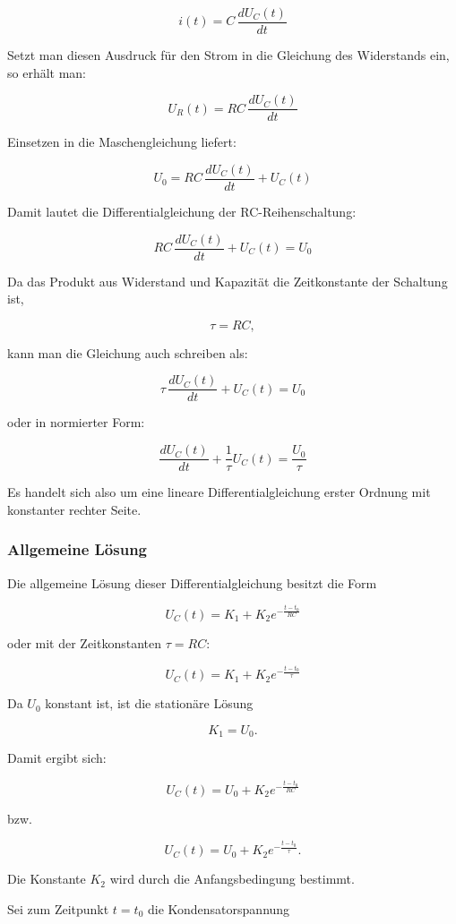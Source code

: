 \[
i(t) = C\,\frac{dU_C(t)}{dt}
\]

Setzt man diesen Ausdruck für den Strom in die Gleichung des Widerstands ein,
so erhält man:

\[
U_R(t) = R C\,\frac{dU_C(t)}{dt}
\]

Einsetzen in die Maschengleichung liefert:

\[
U_0 = R C\,\frac{dU_C(t)}{dt} + U_C(t)
\]

Damit lautet die Differentialgleichung der RC-Reihenschaltung:

\[
R C\,\frac{dU_C(t)}{dt} + U_C(t) = U_0
\]

Da das Produkt aus Widerstand und Kapazität die Zeitkonstante der Schaltung ist,

\[
\tau = R C,
\]

kann man die Gleichung auch schreiben als:

\[
\tau\,\frac{dU_C(t)}{dt} + U_C(t) = U_0
\]

oder in normierter Form:

\[
\frac{dU_C(t)}{dt} + \frac{1}{\tau}U_C(t)
=
\frac{U_0}{\tau}
\]

Es handelt sich also um eine lineare Differentialgleichung erster Ordnung
mit konstanter rechter Seite.

\subsubsection{Allgemeine Lösung}
\label{subsubsec:allgemeine-loesung-rc-schaltung}

Die allgemeine Lösung dieser Differentialgleichung besitzt die Form

\[
U_C(t) = K_1 + K_2 e^{-\frac{t-t_0}{R C}}
\]

oder mit der Zeitkonstanten $\tau = RC$:

\[
U_C(t) = K_1 + K_2 e^{-\frac{t-t_0}{\tau}}
\]

Da $U_0$ konstant ist, ist die stationäre Lösung

\[
K_1 = U_0.
\]

Damit ergibt sich:

\[
U_C(t) = U_0 + K_2 e^{-\frac{t-t_0}{R C}}
\]

bzw.

\[
U_C(t) = U_0 + K_2 e^{-\frac{t-t_0}{\tau}}.
\]

Die Konstante $K_2$ wird durch die Anfangsbedingung bestimmt.

Sei zum Zeitpunkt $t=t_0$ die Kondensatorspannung

